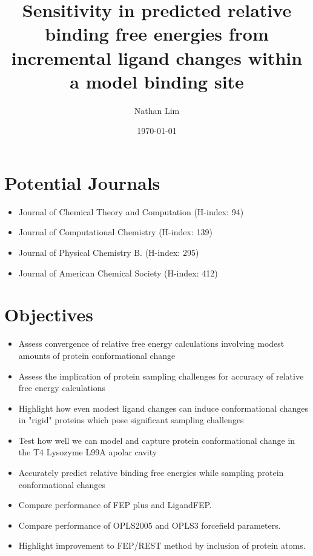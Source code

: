 \documentclass{article}
\begin{document}
\title{Sensitivity in predicted relative binding free energies from incremental ligand changes within a model binding site}
\date{\today}
\author{Nathan Lim}
\maketitle


\section{Potential Journals}
\begin{itemize}
   \item Journal of Chemical Theory and Computation (H-index: 94)
   \item Journal of Computational Chemistry (H-index: 139)
   \item Journal of Physical Chemistry B. (H-index: 295)
   \item Journal of American Chemical Society (H-index: 412)
\end{itemize}

\section{Objectives}
\begin{itemize}
   \item Assess convergence of relative free energy calculations involving modest amounts of protein conformational change
   \item Assess the implication of protein sampling challenges for accuracy of relative free energy calculations
   \item Highlight how even modest ligand changes can induce conformational changes in "rigid" proteins which pose significant sampling challenges
   \item Test how well we can model and capture protein conformational change in the T4 Lysozyme L99A apolar cavity
   \item Accurately predict relative binding free energies while sampling protein conformational changes
   \item Compare performance of FEP plus \cite{FEPplus} and LigandFEP.
   \item Compare performance of OPLS2005 and OPLS3 forcefield parameters.
   \item Highlight improvement to FEP/REST \cite{REST2} method by inclusion of protein atoms.
\end{itemize}
\end{document}
